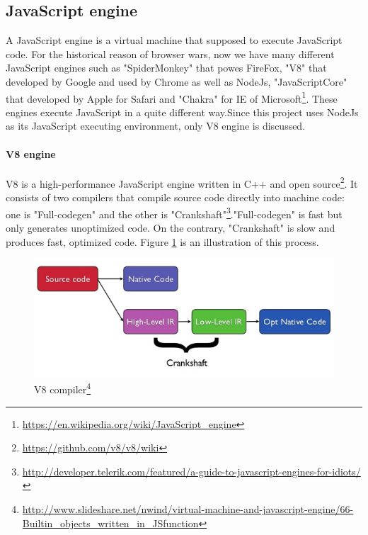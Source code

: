     \subsection{JavaScript engine}
    A JavaScript engine is a virtual machine that supposed to execute JavaScript code. For the historical reason of browser wars, now we have many different JavaScript engines such as "SpiderMonkey" that powes FireFox, "V8" that developed by Google and used by Chrome as well as NodeJs, "JavaScriptCore" that developed by Apple for Safari and "Chakra" for IE of Microsoft\footnote{\url{https://en.wikipedia.org/wiki/JavaScript_engine}}. These engines execute JavaScript in a quite different way.Since this project uses NodeJs as its JavaScript executing environment, only V8 engine is discussed.
    
    \paragraph{V8 engine} V8 is a high-performance JavaScript engine written in C++ and open source\footnote{\label{foot:v8git}\url{https://github.com/v8/v8/wiki}}. It consists of two compilers that compile source code directly into machine code: one is "Full-codegen" and the other is "Crankshaft"\footnote{\label{foot:v8Intro}\url{http://developer.telerik.com/featured/a-guide-to-javascript-engines-for-idiots/}}."Full-codegen" is fast but only generates unoptimized code. On the contrary, "Crankshaft" is slow and produces fast, optimized code. Figure \ref{fig:V8compiler} is an illustration of this process.
    
        \begin{figure}[H]
            \centering
            \includegraphics[scale = 0.4]
            {Images/concepts/v8.png}
            \caption[V8compiler]%
            {V8 compiler\footnote{\url{http://www.slideshare.net/nwind/virtual-machine-and-javascript-engine/66-Builtin_objects_written_in_JSfunction}}}  
            \label{fig:V8compiler}
        \end{figure}
        
